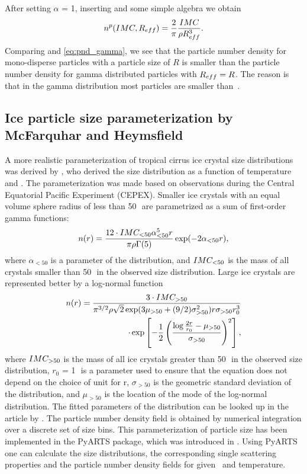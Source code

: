 After setting $\alpha$ = 1, inserting  and
some simple algebra we obtain
\begin{equation}
  \label{eq:pnd_gamma}
  n^p(IMC, R_{eff}) = \frac{2}{\pi} \frac{IMC}{\rho R_{eff}^3}.
\end{equation}
Comparing  and \eqref{eq:pnd_gamma}, we see
that the particle number density for mono-disperse particles with a
particle size of $R$ is smaller than the particle number density for
gamma distributed particles with $R_{eff}=R$. The reason is that in the
gamma distribution most particles are smaller than~\Reff.

\subsection[McFarquhar and Heymsfield parametrization]{Ice particle size parameterization by McFarquhar and Heymsfield}
\label{sec:McFHey_distr}

A more realistic parameterization of tropical cirrus ice crystal size
distributions was derived by
\citet{mcfarquar97:_param_tropic_cirrus_ice_cryst}, who derived the
size distribution as a function of temperature and \imc. The
parameterization was made based on observations during the Central
Equatorial Pacific Experiment (CEPEX). Smaller ice crystals with an
equal volume sphere radius of less than 50\,\mum\ are parametrized
as a sum of first-order gamma functions:
\begin{equation}
  \label{eq:MH_gamma}
  n(r) = \frac{12\cdot IMC_{<50}\alpha^5_{<50} r}{\pi \rho
    \Gamma(5)} \exp(-2 \alpha_{<50} r), 
\end{equation}
where $\alpha_{<50}$ is a parameter of the distribution, and
$IMC_{<50}$ is the mass of all crystals smaller than 50\,\mum\ in
the observed size distribution.  Large ice crystals are represented
better by a log-normal function
\begin{eqnarray}
  \label{eq:MH_lognorm}
  n(r) = \frac{3\cdot IMC_{>50}}{\pi^{3/2}\rho \sqrt{2}
    \exp(3\mu_{>50}+(9/2)\sigma^2_{>50}) r \sigma_{>50} r_0^3}
  \nonumber \\
  \cdot \exp\left[-\frac{1}{2}\left(\frac{\log\frac{2r}{r_0} -
          \mu_{>50}}{\sigma_{>50}}\right)^2\right], 
\end{eqnarray}
where $IMC_{>50}$ is the mass of all ice crystals greater than
50\,\mum\ in the observed size distribution, $r_0$ = 1\,\mum\ is a
parameter used to ensure that the equation does not depend on the
choice of unit for r, $\sigma_{>50}$ is the geometric standard
deviation of the distribution, and $\mu_{>50}$ is the location of the
mode of the log-normal distribution.  The fitted parameters of the
distribution can be looked up in the article by
\citet{mcfarquar97:_param_tropic_cirrus_ice_cryst}.  The particle
number density field is obtained by numerical integration over a
discrete set of size bins. This parameterization of particle size has
been implemented in the PyARTS package, which was introduced in
. Using PyARTS one can calculate the size
distributions, the corresponding single scattering properties and the
particle number density fields for given \imc\ and temperature.
